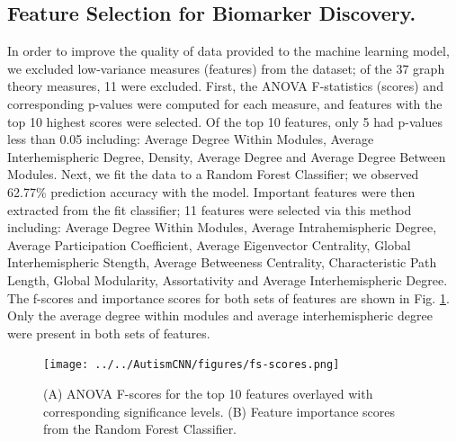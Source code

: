 \documentclass[10pt,conference]{IEEEtran}
\begin{document}
    \subsection{Feature Selection for Biomarker Discovery.} 

    In order to improve the quality of data provided to the machine learning model, we
    excluded low-variance measures (features) from the dataset; of the 37 graph theory
    measures, 11 were excluded. First, the ANOVA F-statistics (scores) and corresponding 
    p-values were computed for each measure, and features with the top 10 highest scores
    were selected. Of the top 10 features, only 5 had p-values less than 0.05 including:
    Average Degree Within Modules, Average Interhemispheric Degree, Density, Average 
    Degree and Average Degree Between Modules. Next, we fit the data to a Random Forest
    Classifier; we observed 62.77\% prediction accuracy with the model. Important
    features were then extracted from the fit classifier; 11 features were selected via
    this method including: Average Degree Within Modules, Average Intrahemispheric Degree, 
    Average Participation Coefficient, Average Eigenvector Centrality, Global
    Interhemispheric Stength, Average Betweeness Centrality, Characteristic Path Length,
    Global Modularity, Assortativity and Average Interhemispheric Degree. The f-scores
    and importance scores for both sets of features are shown in Fig. \ref{fs-scores}.
    Only the average degree within modules and average interhemispheric degree were 
    present in both sets of features.

    \begin{figure}[ht]
        \vskip 0.2in
        \begin{center}
            \centerline{\texttt{[image: ../../AutismCNN/figures/fs-scores.png]}}
            \caption{
                (A) ANOVA F-scores for the top 10 features overlayed with corresponding
                significance levels. (B) Feature importance scores from the Random Forest
                Classifier.
            }
            \label{fs-scores}
        \end{center}
        \vskip -0.2in
    \end{figure}




\newpage
\end{document}
